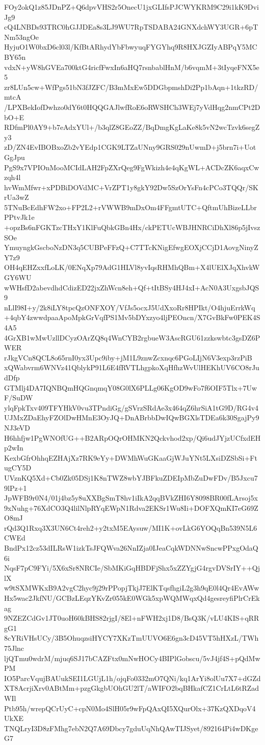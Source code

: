 FOy2okQ1z85JDnPZ+Q6dpvVHS2r5OnecU1jxGLIfsPJCWYKRM9C29i1kK9DviJg9
cQ4LNBDs93TRC0hGJJDEa8s3LJ9WU7RpTSDABA24GNXdchWY3UGR+6pTNm53ngOe
HyjuO1W0bxD6cl03l/KfBtARhydYbFbwyuqFYGYhq9R8HXJGZIyABPqY5MCBY65n
vdxN+yW8hGVEa700ktG4ricfFwxIn6aHQ7rsnbablHnM/b6vqmM+3tIyqeFNX5e5
zr8LUn5cw+WfPgs51bN3fJZFC/B3mMxEw5DDGbpmshDi2Pp1bAqn+1tkzRD/mtcA
/LPXBekIofDwhzo0dY6t0HQQGAJlwfRoE6oRWSHCh3WEj7yVdHqg2nmCPt2DbO+E
RDfmPl0AY9+b7eAdxYUl+/b3qlZ8GEoZZ/BqDmgKgLaKe8k5vN2wcTzvk6segZy3
zD/ZN4EvIBOBxoZb2vYEdp1CGK9LTZaUNny9GRS029nUwmD+j5brn7i+UotGgJpu
PgS9x7VPIOnMooMCIdLAH2FpZXrQeg9FgWkizh4e4qKgWL+ACDcZK6aqxCwzqh4l
hvWmMfwr+xPDBiDOVdMC+VrZPT1y8gkY92Dw5SzOrYsFn4cPCo3TQQr/SKrUa3wZ
5TNuBcEdhFW2xo+FP2L2+rVWWB9mDxOm4FFgmtUTC+QftmUhBizeLLbrPPtvJk1e
+opzBs6nFGKTzcTHxY1KlFuQbkGBn4Hx/ckPETUcWBJHNRCiDhXl86p5jIvszSOe
YmuyngkGscboNzDN3q5CUBPeFFzQ+C7TTcKNigEfwgEOXjCCjD1AovgNinyZY7z9
OH4qEHZxxfLoLK/0ENqXp79AdG1HLVl8yvIqsRHMhQBm+X4lUElXJqXhvkWGY6WU
wWHsfD2abevdhdCdizED22jxZhWcn8eh+Qf+tItBSy4HJ4xI+AcN0A3UxgsbJQS9
nLlI98I+y/2k8iLY8tpcQzONFXOY/VfJs5ocxJ5UdXxoRr8HPIkt/O4hjuErrkWq
+4qbY4zwwdpaaApoMpkGrVqfPS1Mv5bDYxzyo4ljPEOncn/X7GvBkFw0PEK4S4A5
4GrXB1wMwUzllDCyzOArZQ8q4WnCYB2rgbueW3AscRGU61zzkswbtc3gsDZ6PWER
rJkgVCn8QCL8o65rnI0yx3Upc9iby+jM1L9znwZcxnqc6PGoLIjN6V3exp3rzPiB
xQWabvrm6WNVz41QblykP91L6E4fRVTLhgpkoXqHfhzWvUlHEKhUV6CO8rJudDfp
GTMlj4DA7IQNBQmHQGnqmqY08G0lX6PLLg06KgOD9wFo7f6OIF5Tlx+7UwF/SuDW
ylqFpkTxv409TFYHkV0vu3TPndiGg/gSVrzSRdAe3x464qZ6hrSiA1tG9D/RG4v4
UJMxZDaEhyFZOlDwHMnE3OyJQ+DnABrbbDwIQwBGXlsTDEa6k30SgajPy9NJ3eVD
H6hhfjw1PgWNOfUG++B2ARpOQrOHMKN2Qckvhod2xp/Qi6udJYjzUCfxdEHp2wIn
KexbGfrOhhqEZHAjXz7RK9eYy+DWMhWuGKaaGjWJuYNt5LXsiDZSbSi+FtugCY5D
UVznKQ5Xd+Cb0Zk05DSj1K8nTWZ8wbYJBFkuZDEIpMbZuDwFDv/B5Jxcu79lPz+1
JpWFB9r0N4/01j4bz5y8uXXBgSmT8hv1iIkA2qqBVkZHI6Y8098BR00fLArsoj5x
9xNuhg+76XdCO3Q4lilNlpRYqEWpN1Rdva2EKSr1Wu8Ii+DOFXQmKI7eG69ZO8mJ
rQd3Q1Rxq3X3UN6Ct4reh2+y2txM5EAysuw/MI1K+ovLkG6YOQqBn539N5L6CWEd
BndPx12cz53dILRsW1izkTsJFQWva26NnIZja0IJeaCqkWDNNwSncwPPxgOdaQ6i
NqsF7pC9FYi/5X6xSr8NRCIe/SbMKiGqHBDFjShx5xZZYgjG4rgvDVSrIY++QjlX
w9tSXMWKxB9A2vgC2hyc9j29rPPopjTkjJ7ElKTqsfhgiL2g3h9qE0l4Qr4EvAWw
Hx5wac2JkfNU/GCBzLEqzYKvZr055kE0WGk5xpWQMWqxQd4gesreyfiPlrCrEkag
9NZEZCdGv1JT0uoH60kBHS82rjgI/8El+nFWH2xj1D8/BsQ3K/vLU4KIS+qRRgG1
8cYRiVHsUCy/3B5OhuqzsiHYCY7XKzTmUUVO6E6gn3cD45VT5hHXzL/TWh75Jlnc
ljQTmu0wdrM/mjuq6SJ17bCAZFtx0mNwHOCy4BIPlGobscu/5vJ4jf4S+pQdMwPM
IO5ParcVqujBAUukSEI1LGUjL1h/ojqFo0332mO7QNi/kq1ArYi8olUu7X7+dGZd
XT8AcrjiXrv0ABtMm+pzgGkgbUOhGU2lT/aWIFO2bqBHkafCZ1CrLtL6tRZadWIl
Ptb95h/wrepQCrUyC+cpN0Mo4SlH05r9wFpQAxQI5XQurOlx+37KzQXDqoV4UkXE
TNQLryI3D8zFMhg7ebN2Q7A69Dbcy7gduUqNhQAwTIJSyet/892164Pi4wDKgeG7
